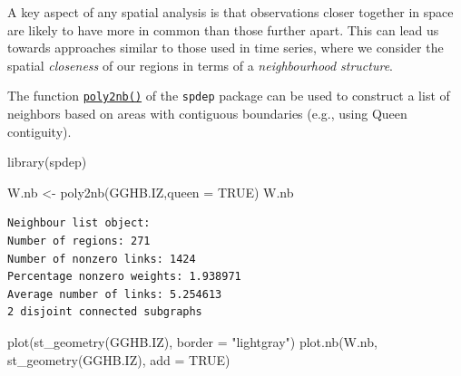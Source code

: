 \documentclass[
  letterpaper,
  DIV=11,
  numbers=noendperiod]{scrartcl}
\newenvironment{Shaded}{\begin{snugshade}}{\end{snugshade}}
\newcommand{\AttributeTok}[1]{\textcolor[rgb]{0.40,0.45,0.13}{#1}}
\newcommand{\ConstantTok}[1]{\textcolor[rgb]{0.56,0.35,0.01}{#1}}
\newcommand{\FunctionTok}[1]{\textcolor[rgb]{0.28,0.35,0.67}{#1}}
\newcommand{\NormalTok}[1]{\textcolor[rgb]{0.00,0.23,0.31}{#1}}
\newcommand{\OtherTok}[1]{\textcolor[rgb]{0.00,0.23,0.31}{#1}}
\newcommand{\StringTok}[1]{\textcolor[rgb]{0.13,0.47,0.30}{#1}}
\begin{document}
A key aspect of any spatial analysis is that observations closer
together in space are likely to have more in common than those further
apart. This can lead us towards approaches similar to those used in time
series, where we consider the spatial \emph{closeness} of our regions in
terms of a \emph{neighbourhood structure}.

The function
\href{https://r-spatial.github.io/spdep/reference/poly2nb.html}{\texttt{poly2nb()}}
of the \texttt{spdep} package can be used to construct a list of
neighbors based on areas with contiguous boundaries (e.g., using Queen
contiguity).

\begin{Shaded}
\begin{Highlighting}[]
\FunctionTok{library}\NormalTok{(spdep)}

\NormalTok{W.nb }\OtherTok{\textless{}{-}} \FunctionTok{poly2nb}\NormalTok{(GGHB.IZ,}\AttributeTok{queen =} \ConstantTok{TRUE}\NormalTok{)}
\NormalTok{W.nb}
\end{Highlighting}
\end{Shaded}

\begin{verbatim}
Neighbour list object:
Number of regions: 271 
Number of nonzero links: 1424 
Percentage nonzero weights: 1.938971 
Average number of links: 5.254613 
2 disjoint connected subgraphs
\end{verbatim}

\begin{Shaded}
\begin{Highlighting}[]
\FunctionTok{plot}\NormalTok{(}\FunctionTok{st\_geometry}\NormalTok{(GGHB.IZ), }\AttributeTok{border =} \StringTok{"lightgray"}\NormalTok{)}
\FunctionTok{plot.nb}\NormalTok{(W.nb, }\FunctionTok{st\_geometry}\NormalTok{(GGHB.IZ), }\AttributeTok{add =} \ConstantTok{TRUE}\NormalTok{)}
\end{Highlighting}
\end{Shaded}
\end{document}
